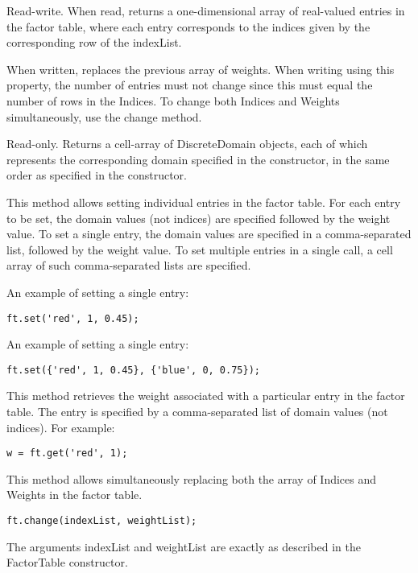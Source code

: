 
Read-write.  When read, returns a one-dimensional array of real-valued entries in the factor table, where each entry corresponds to the indices given by the corresponding row of the indexList.

When written, replaces the previous array of weights.  When writing using this property, the number of entries must not change since this must equal the number of rows in the Indices.  To change both Indices and Weights simultaneously, use the change method.


Read-only.  Returns a cell-array of DiscreteDomain objects, each of which represents the corresponding domain specified in the constructor, in the same order as specified in the constructor.



\label{sec:FactorTable.set}

This method allows setting individual entries in the factor table.  For each entry to be set, the domain values (not indices) are specified followed by the weight value.  To set a single entry, the domain values are specified in a comma-separated list, followed by the weight value.  To set multiple entries in a single call, a cell array of such comma-separated lists are specified.

An example of setting a single entry:
\begin{lstlisting}
ft.set('red', 1, 0.45);
\end{lstlisting}

An example of setting a single entry:
\begin{lstlisting}
ft.set({'red', 1, 0.45}, {'blue', 0, 0.75});
\end{lstlisting}



This method retrieves the weight associated with a particular entry in the factor table.  The entry is specified by a comma-separated list of domain values (not indices).  For example:

\begin{lstlisting}
w = ft.get('red', 1);
\end{lstlisting}



This method allows simultaneously replacing both the array of Indices and Weights in the factor table.

\begin{lstlisting}
ft.change(indexList, weightList);
\end{lstlisting}

The arguments indexList and weightList are exactly as described in the FactorTable constructor.

